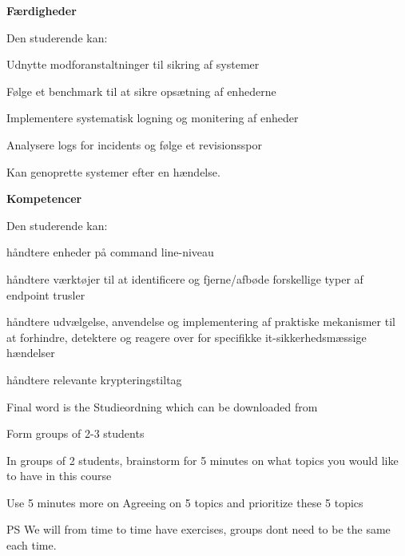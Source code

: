 \documentclass[Screen16to9,17pt]{foils}
\begin{document}

{\bf Færdigheder}

Den studerende kan:
\begin{list2}
\item Udnytte modforanstaltninger til sikring af systemer
\item Følge et benchmark til at sikre opsætning af enhederne
\item Implementere systematisk logning og monitering af enheder
\item Analysere logs for incidents og følge et revisionsspor
\item Kan genoprette systemer efter en hændelse.
\end{list2}


{\bf Kompetencer}

Den studerende kan:
\begin{list2}
\item håndtere enheder på command line-niveau
\item håndtere værktøjer til at identificere og fjerne/afbøde forskellige typer af endpoint trusler
\item håndtere udvælgelse, anvendelse og implementering af praktiske mekanismer til at forhindre, detektere og reagere over for specifikke it-sikkerhedsmæssige hændelser
\item håndtere relevante krypteringstiltag
\end{list2}

Final word is the Studieordning which can be downloaded from\\
{\footnotesize
{}}



Form groups of 2-3 students

In groups of 2 students, brainstorm for 5 minutes on what topics you would like to have in this course

Use 5 minutes more on Agreeing on 5 topics and prioritize these 5 topics

\vskip 1cm
PS We will from time to time have exercises, groups dont need to be the same each time.


\end{document}
